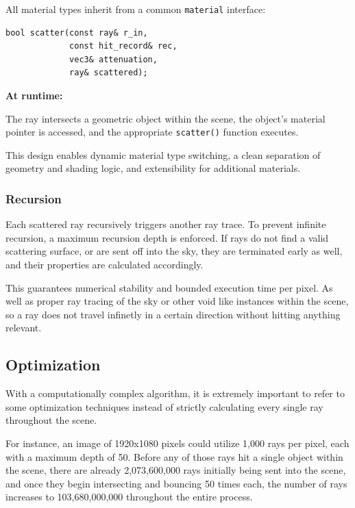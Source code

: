 \documentclass[11pt]{article}
\begin{document}
All material types inherit from a common \texttt{material} interface:
\begin{verbatim}
bool scatter(const ray& r_in, 
             const hit_record& rec,
             vec3& attenuation,
             ray& scattered);
\end{verbatim}

\textbf{At runtime:}

The ray intersects a geometric object within the scene, the object's material pointer is accessed, and the appropriate \texttt{scatter()} function executes.

This design enables dynamic material type switching, a clean separation of geometry and shading logic, and extensibility for additional materials.

\subsubsection{Recursion}

Each scattered ray recursively triggers another ray trace. To prevent infinite recursion, a maximum recursion depth is enforced. If rays do not find a valid scattering surface, or are sent off into the sky, they are terminated early as well, and their properties are calculated accordingly.

This guarantees numerical stability and bounded execution time per pixel. As well as proper ray tracing of the sky or other void like instances within the scene, so a ray does not travel infinetly in a certain direction without hitting anything relevant.






\subsection{Optimization}

With a computationally complex algorithm, it is extremely important to refer to some optimization techniques instead of strictly calculating every single ray throughout the scene. 

For instance, an image of 1920x1080 pixels could utilize 1,000 rays per pixel, each with a maximum depth of 50. Before any of those rays hit a single object within the scene, there are already 2,073,600,000 rays initially being sent into the scene, and once they begin intersecting and bouncing 50 times each, the number of rays increases to 103,680,000,000 throughout the entire process. 
\end{document}
